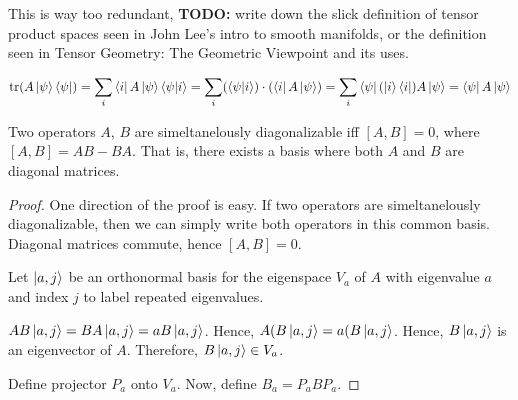 This is way too redundant, \textbf{TODO:} write down the slick definition of tensor
product spaces seen in John Lee's intro to smooth manifolds, or the definition
seen in Tensor Geometry: The Geometric Viewpoint and its uses.

\begin{align*}
    \tr(A \ket \psi \bra \psi) = 
    \sum_i \bra i A \ket \psi \bra{\psi}\ket{i} =  
    \sum_i (\bra{\psi}\ket{i}) \cdot (\bra i A \ket \psi) = 
    \sum_i \bra{\psi}(\ket{i} \bra i) A \ket \psi = 
    \bra{\psi} A \ket \psi 
\end{align*}


\begin{theorem}
    Two operators $A$, $B$ are simeltanelously diagonalizable iff $[A, B] = 0$,
    where $[A, B] = AB - BA$. That is, there exists a basis where both $A$
    and $B$ are diagonal matrices.
\end{theorem}
\begin{proof}
    One direction of the proof is easy. If two operators are simeltanelously
    diagonalizable, then we can simply write both operators in this common
    basis. Diagonal matrices commute, hence $[A, B] = 0$.

    Let $\ket{a, j}$ be an orthonormal basis for the eigenspace $V_a$ of $A$
    with eigenvalue $a$ and index $j$ to label repeated eigenvalues.

    $AB \ket{a, j} = BA \ket{a, j} = a B \ket {a, j}$. Hence,
    $A (B \ket {a, j} = a (B \ket {a, j}$. Hence, $B \ket {a, j}$ is an
    eigenvector of $A$. Therefore, $B\ket{a, j} \in V_a$. 

    Define projector $P_a$ onto $V_a$. Now, define $B_a = P_a B P_a$.
\end{proof}
